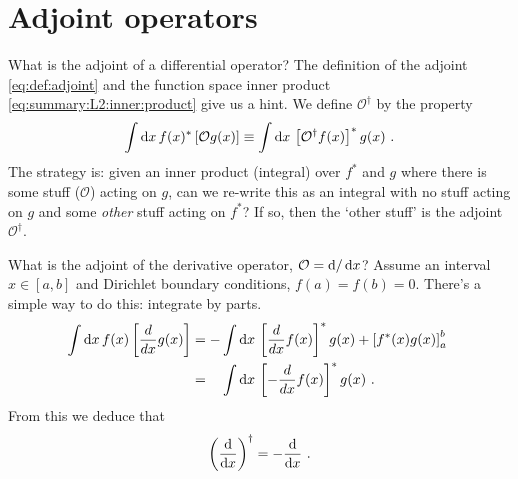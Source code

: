\section{Adjoint operators}

What is the adjoint of a differential operator? The definition of the adjoint \eqref{eq:def:adjoint} and the function space inner product \eqref{eq:summary:L2:inner:product} give us a hint. We define $\mathcal O^\dag$ by the property
\begin{align}
  \int \operatorname{d}\mkern-3mu^{}\mkern-1mu{x} \, f(x)^* \left[\mathcal O g(x)\right]
  \equiv
  \int \operatorname{d}\mkern-3mu^{}\mkern-1mu{x} \, \left[\mathcal O^\dag f(x)\right]^*  g(x) \ .
\end{align}
The strategy is: given an inner product (integral) over $f^*$ and $g$ where there is some stuff ($\mathcal O$) acting on $g$, can we re-write this as an integral with no stuff acting on $g$ and some \emph{other} stuff acting on $f^*$? If so, then the `other stuff' is the adjoint $\mathcal O^\dag$.
\begin{example}
What is the adjoint of the derivative operator, $\mathcal O = \operatorname{d}\mkern-3mu^{}\mkern-1mu{}/\operatorname{d}\mkern-3mu^{}\mkern-1mu{x}$? Assume an interval $x\in[a,b]$ and Dirichlet boundary conditions, $f(a)=f(b)=0$. There's a simple way to do this: integrate by parts.
\begin{align}
  \int \D{x} \,  f(x) \left[\frac{d}{dx} g(x)\right]
  &=
  - \int \D{x} \, \left[\frac{d}{dx}f(x)\right]^* g(x)
  +
  \left[f^*(x)g(x)\right]^b_a \ 
  \\
  &= \phantom{+}
  \int \D{x} \, \left[-\frac{d}{dx}f(x)\right]^* g(x)
  \ . 
\end{align}
From this we deduce that
\begin{align}
  \left(\frac{\operatorname{d}\mkern-3mu^{}\mkern-1mu{}}{\operatorname{d}\mkern-3mu^{}\mkern-1mu{x}}\right)^\dag = - \frac{\operatorname{d}\mkern-3mu^{}\mkern-1mu{}}{\operatorname{d}\mkern-3mu^{}\mkern-1mu{x}} \ .
\end{align}
\end{example}

